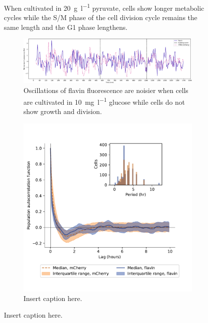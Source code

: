\begin{figure}
  \caption{
    When cultivated in \SI{20}{\gram~\litre^{-1}} pyruvate, cells show longer metabolic cycles while the S/M phase of the cell division cycle remains the same length and the G1 phase lengthens.
  }
  \label{fig:biology-pyruvate}
\end{figure}


\begin{figure}
  \centering
  \begin{subfigure}[htpb]{0.9\textwidth}
   \centering
   \includegraphics[width=\textwidth]{limiting_single_birth_plot_edit.pdf}
   \caption{
     Oscillations of flavin fluorescence are noisier when cells are cultivated in \SI{10}{\milli\gram~\litre^{-1}} glucose while cells do not show growth and division.
   }
   \label{fig:biology-lowglc-single}
  \end{subfigure}

  \begin{subfigure}[htpb]{0.7\textwidth}
   \centering
   \includegraphics[width=\textwidth]{htb2mCherry_31492_12.pdf}
   \caption{
     Insert caption here.
   }
   \label{fig:biology-lowglc-acf}
  \end{subfigure}



\end{figure}

